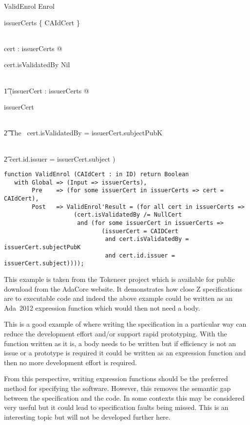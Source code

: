 \documentclass{llncs} \usepackage[utf8]{inputenc} \usepackage{url}
\newcommand{\adatwtw}{Ada~2012\xspace}
\begin{document}
\begin{schema}{ValidEnrol}
Enrol\\ \where

        issuerCerts \cap \{ CAIdCert \} \neq \emptyset

\also

\\ \forall cert : issuerCerts @

           cert.isValidatedBy \neq Nil

\\ \t1 \land (\exists issuerCert : issuerCerts @

        issuerCert 

\\ \t2 \land The \ cert.isValidatedBy = issuerCert.subjectPubK

\\ \t2 \land cert.id.issuer = issuerCert.subject )

\end{schema}

\begin{lstlisting}[language=SPARK]
function ValidEnrol (CAIdCert : in ID) return Boolean
   with Global => (Input => issuerCerts),
        Pre    => (for some issuerCert in issuerCerts => cert = CAIdCert),
        Post   => ValidEnrol'Result = (for all cert in issuerCerts =>
                    (cert.isValidatedBy /= NullCert
                     and (for some issuerCert in issuerCerts =>
                            (issuerCert = CAIDCert
                             and cert.isValidatedBy = issuerCert.subjectPubK
                             and cert.id.issuer = issuerCert.subject))));
\end{lstlisting}

This example is taken from the Tokeneer project which is available for
public download from the AdaCore website. It demonstrates how close Z
specifications are to executable code and indeed the above example
could be written as an \adatwtw expression function which would then
not need a body.

This is a good example of where writing the specification in a
particular way can reduce the development effort and/or support rapid
prototyping. With the function written as it is, a body needs to be
written but if efficiency is not an issue or a prototype is required
it could be written as an expression function and then no more
development effort is required.

From this perspective, writing expression functions should be the
preferred method for specifying the software. However, this removes
the semantic gap between the specification and the code. In some
contexts this may be considered very useful but it could lead to
specification faults being missed. This is an interesting topic but
will not be developed further here.
\end{document}
